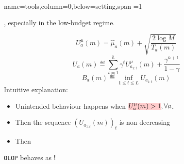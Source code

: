 \documentclass[paperwidth=36in, paperheight=48in,portrait,fontscale=0.35, margin=2cm]{baposter}
\begin{document}
\begin{poster}
{name=tools,column=0,below=setting,span =1}
{

, especially in the low-budget regime.

\begin{equation}
         U^{\mu}_a(m) = \hat{\mu}_a(m) + \sqrt{\frac{2 \log M}{T_a(m)}}
    \end{equation}
    \begin{equation}
    \label{eq:Ua}
        U_a(m) \eqdef \sum_{t = 1}^h \gamma^t U^{\mu}_{a_{1:t}}(m) + \frac{\gamma^{h+1}}{1-\gamma}
    \end{equation}
    \begin{equation}
    \label{eq:Ba}
        B_a(m) \eqdef \inf_{1 \leq t \leq L} U_{a_{1:t}}(m)
    \end{equation}
    Intuitive explanation: 
    \begin{itemize}
        \item Unintended behaviour happens when $\hler{U^{\mu}_a(m) > 1}, \forall a$. 
        \item Then the sequence $(U_{a_{1:t}}(m))_t$ is non-decreasing
        \item Then 
    \end{itemize}



\begin{center}
\texttt{OLOP} behaves as !    
\end{center}
}


\end{poster}
\end{document}
